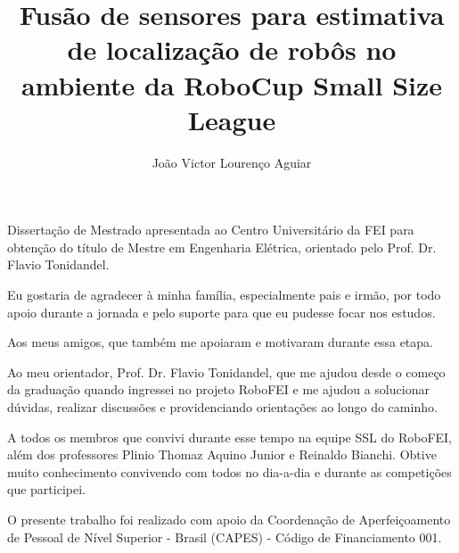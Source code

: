 \documentclass[acronym, symbols, table, deposito]{fei}
\title{Fusão de sensores para estimativa de localização de robôs no ambiente da RoboCup Small Size League}
\author{João Victor Lourenço Aguiar}
\begin{document}
	
\maketitle

\begin{folhaderosto}
	Dissertação de Mestrado apresentada ao Centro Universitário da FEI para obtenção do título de Mestre em Engenharia Elétrica, orientado pelo Prof. Dr. Flavio Tonidandel.
\end{folhaderosto}

\fichacatalografica

\begin{agradecimentos}
	Eu gostaria de agradecer à minha família, especialmente pais e irmão, por todo apoio durante a jornada e pelo suporte para que eu pudesse focar nos estudos.
	
	Aos meus amigos, que também me apoiaram e motivaram durante essa etapa.
	
	Ao meu orientador, Prof. Dr. Flavio Tonidandel, que me ajudou desde o começo da graduação quando ingressei no projeto RoboFEI e me ajudou a solucionar dúvidas, realizar discussões e providenciando orientações ao longo do caminho.
	
	A todos os membros que convivi durante esse tempo na equipe SSL do RoboFEI, além dos professores Plinio Thomaz Aquino Junior e Reinaldo Bianchi. Obtive muito conhecimento convivendo com todos no dia-a-dia e durante as competições que participei.
	
	O presente trabalho foi realizado com apoio da Coordenação de Aperfeiçoamento de Pessoal de Nível Superior - Brasil (CAPES) - Código de Financiamento 001.
\end{agradecimentos}

\begin{epigrafe}
\end{epigrafe}
	
\end{document}
